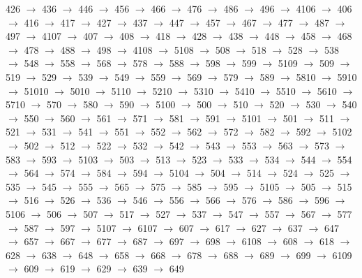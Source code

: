 426 $\rightarrow$ 436 $\rightarrow$ 446 $\rightarrow$ 456 $\rightarrow$ 466 $\rightarrow$ 476 $\rightarrow$ 486 $\rightarrow$ 496 $\rightarrow$ 4106 $\rightarrow$ 406 $\rightarrow$ 416 $\rightarrow$ 417 $\rightarrow$ 427 $\rightarrow$ 437 $\rightarrow$ 447 $\rightarrow$ 457 $\rightarrow$ 467 $\rightarrow$ 477 $\rightarrow$ 487 $\rightarrow$ 497 $\rightarrow$ 4107 $\rightarrow$ 407 $\rightarrow$ 408 $\rightarrow$ 418 $\rightarrow$ 428 $\rightarrow$ 438 $\rightarrow$ 448 $\rightarrow$ 458 $\rightarrow$ 468 $\rightarrow$ 478 $\rightarrow$ 488 $\rightarrow$ 498 $\rightarrow$ 4108 $\rightarrow$ 5108 $\rightarrow$ 508 $\rightarrow$ 518 $\rightarrow$ 528 $\rightarrow$ 538 $\rightarrow$ 548 $\rightarrow$ 558 $\rightarrow$ 568 $\rightarrow$ 578 $\rightarrow$ 588 $\rightarrow$ 598 $\rightarrow$ 599 $\rightarrow$ 5109 $\rightarrow$ 509 $\rightarrow$ 519 $\rightarrow$ 529 $\rightarrow$ 539 $\rightarrow$ 549 $\rightarrow$ 559 $\rightarrow$ 569 $\rightarrow$ 579 $\rightarrow$ 589 $\rightarrow$ 5810 $\rightarrow$ 5910 $\rightarrow$ 51010 $\rightarrow$ 5010 $\rightarrow$ 5110 $\rightarrow$ 5210 $\rightarrow$ 5310 $\rightarrow$ 5410 $\rightarrow$ 5510 $\rightarrow$ 5610 $\rightarrow$ 5710 $\rightarrow$ 570 $\rightarrow$ 580 $\rightarrow$ 590 $\rightarrow$ 5100 $\rightarrow$ 500 $\rightarrow$ 510 $\rightarrow$ 520 $\rightarrow$ 530 $\rightarrow$ 540 $\rightarrow$ 550 $\rightarrow$ 560 $\rightarrow$ 561 $\rightarrow$ 571 $\rightarrow$ 581 $\rightarrow$ 591 $\rightarrow$ 5101 $\rightarrow$ 501 $\rightarrow$ 511 $\rightarrow$ 521 $\rightarrow$ 531 $\rightarrow$ 541 $\rightarrow$ 551 $\rightarrow$ 552 $\rightarrow$ 562 $\rightarrow$ 572 $\rightarrow$ 582 $\rightarrow$ 592 $\rightarrow$ 5102 $\rightarrow$ 502 $\rightarrow$ 512 $\rightarrow$ 522 $\rightarrow$ 532 $\rightarrow$ 542 $\rightarrow$ 543 $\rightarrow$ 553 $\rightarrow$ 563 $\rightarrow$ 573 $\rightarrow$ 583 $\rightarrow$ 593 $\rightarrow$ 5103 $\rightarrow$ 503 $\rightarrow$ 513 $\rightarrow$ 523 $\rightarrow$ 533 $\rightarrow$ 534 $\rightarrow$ 544 $\rightarrow$ 554 $\rightarrow$ 564 $\rightarrow$ 574 $\rightarrow$ 584 $\rightarrow$ 594 $\rightarrow$ 5104 $\rightarrow$ 504 $\rightarrow$ 514 $\rightarrow$ 524 $\rightarrow$ 525 $\rightarrow$ 535 $\rightarrow$ 545 $\rightarrow$ 555 $\rightarrow$ 565 $\rightarrow$ 575 $\rightarrow$ 585 $\rightarrow$ 595 $\rightarrow$ 5105 $\rightarrow$ 505 $\rightarrow$ 515 $\rightarrow$ 516 $\rightarrow$ 526 $\rightarrow$ 536 $\rightarrow$ 546 $\rightarrow$ 556 $\rightarrow$ 566 $\rightarrow$ 576 $\rightarrow$ 586 $\rightarrow$ 596 $\rightarrow$ 5106 $\rightarrow$ 506 $\rightarrow$ 507 $\rightarrow$ 517 $\rightarrow$ 527 $\rightarrow$ 537 $\rightarrow$ 547 $\rightarrow$ 557 $\rightarrow$ 567 $\rightarrow$ 577 $\rightarrow$ 587 $\rightarrow$ 597 $\rightarrow$ 5107 $\rightarrow$ 6107 $\rightarrow$ 607 $\rightarrow$ 617 $\rightarrow$ 627 $\rightarrow$ 637 $\rightarrow$ 647 $\rightarrow$ 657 $\rightarrow$ 667 $\rightarrow$ 677 $\rightarrow$ 687 $\rightarrow$ 697 $\rightarrow$ 698 $\rightarrow$ 6108 $\rightarrow$ 608 $\rightarrow$ 618 $\rightarrow$ 628 $\rightarrow$ 638 $\rightarrow$ 648 $\rightarrow$ 658 $\rightarrow$ 668 $\rightarrow$ 678 $\rightarrow$ 688 $\rightarrow$ 689 $\rightarrow$ 699 $\rightarrow$ 6109 $\rightarrow$ 609 $\rightarrow$ 619 $\rightarrow$ 629 $\rightarrow$ 639 $\rightarrow$ 649 